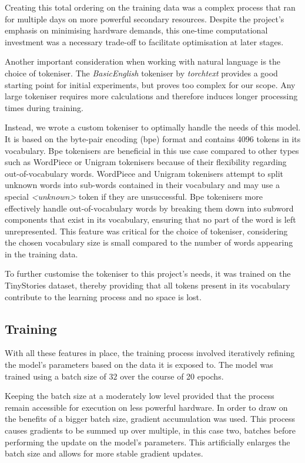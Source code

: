 \documentclass[11pt]{article}
\begin{document}
    Creating this total ordering on the training data was a complex process that ran for multiple days on more powerful secondary resources. Despite the project's emphasis on minimising hardware demands, this one-time computational investment was a necessary trade-off to facilitate optimisation at later stages.

    Another important consideration when working with natural language is the choice of tokeniser.
    The \textit{BasicEnglish} tokeniser by \textit{torchtext} provides a good starting point for initial experiments, but proves too complex for our scope. Any large tokeniser requires more calculations and therefore induces
    longer processing times during training.

    Instead, we wrote a custom tokeniser to optimally handle the needs of this model. It is based on the byte-pair encoding (bpe) format and contains 4096 tokens in its vocabulary. Bpe tokenisers are beneficial in this use case compared to other types such as WordPiece or Unigram tokenisers because of their flexibility regarding
    out-of-vocabulary words.
    WordPiece and Unigram tokenisers attempt to split unknown words into sub-words contained in their vocabulary and may use a special \textit{<unknown>} token if they are unsuccessful. Bpe tokenisers more effectively handle out-of-vocabulary words by breaking them down into subword components that exist in its vocabulary, ensuring that no part of the word is left unrepresented.
    This feature was critical for the choice of tokeniser, considering the chosen vocabulary size is small compared to the number of words appearing in the training data.

    To further customise the tokeniser to this project's needs, it was trained on the TinyStories dataset, thereby providing that all tokens present in its vocabulary contribute to the learning process and no space is lost.

    \subsection*{Training}
    With all these features in place, the training process involved iteratively refining the model's parameters based on the data it is exposed to.
    The model was trained using a batch size of $32$ over the course of 20 epochs.

    Keeping the batch size at a moderately low level provided that the process remain accessible for execution on less powerful hardware.
    In order to draw on the benefits of a bigger batch size, gradient accumulation was used. This process causes gradients to be summed up over multiple, in this case two, batches before performing the update on the model's parameters.
    This artificially enlarges the batch size and allows for more stable gradient updates.
\end{document}
